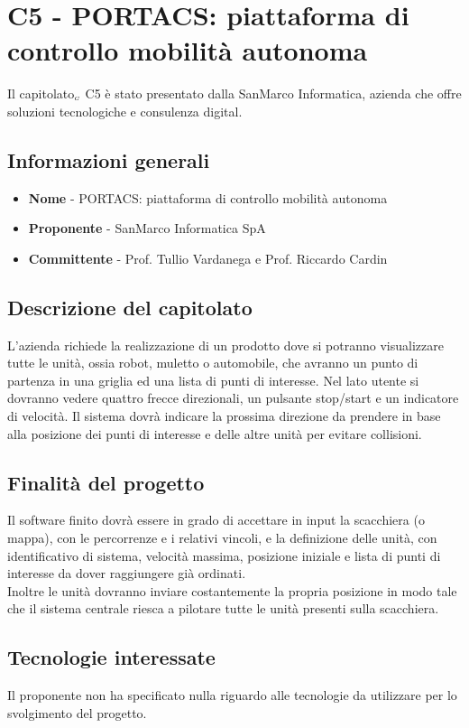 \chapter{C5 - PORTACS: piattaforma di controllo mobilità autonoma} \label{CapitolatoC5}
Il capitolato$_{\scaleto{G}{3pt}}$ C5 è stato presentato dalla SanMarco Informatica, azienda che offre soluzioni tecnologiche e consulenza digital.
\section{Informazioni generali} \label{C5InformazioniGenerali}
\begin{itemize}
	\item \textbf{Nome} - PORTACS: piattaforma di controllo mobilità autonoma
	\item \textbf{Proponente} - SanMarco Informatica SpA
	\item \textbf{Committente} - Prof. Tullio Vardanega e Prof. Riccardo Cardin
\end{itemize}
\section{Descrizione del capitolato} \label{C5DescrizioneDelCapitolato}
L'azienda richiede la realizzazione di un prodotto dove si potranno visualizzare tutte le unità, ossia robot, muletto o automobile, che avranno un punto di partenza in una griglia ed una lista di punti di interesse. Nel lato utente si dovranno vedere quattro frecce direzionali, un pulsante stop/start e un indicatore di velocità. Il sistema dovrà indicare la prossima direzione da prendere in base alla posizione dei punti di interesse e delle altre unità per evitare collisioni.
\section{Finalità del progetto} \label{C5FinalitàDelProgetto}
Il software finito dovrà essere in grado di accettare in input la scacchiera (o mappa), con le percorrenze e i relativi vincoli, e la definizione delle unità, con identificativo di sistema, velocità massima, posizione iniziale e lista di punti di interesse da dover raggiungere già ordinati. \\
Inoltre le unità dovranno inviare costantemente la propria posizione in modo tale che il sistema centrale riesca a pilotare tutte le unità presenti sulla scacchiera.
\section{Tecnologie interessate} \label{C5TecnologieInteressate}
Il proponente non ha specificato nulla riguardo alle tecnologie da utilizzare per lo svolgimento del progetto.
